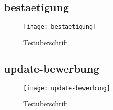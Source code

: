 \begin{landscape}
\subsection{bestaetigung}
\begin{figure}[H]
    \centering
    \caption{Testüberschrift}
    \begin{adjustbox}{width=\linewidth, center}
        \texttt{[image: bestaetigung]}
    \end{adjustbox}
\end{figure}

\subsection{update-bewerbung}
\begin{figure}[H]
    \centering
    \caption{Testüberschrift}
    \begin{adjustbox}{width=\linewidth, center}
        \texttt{[image: update-bewerbung]}
    \end{adjustbox}
\end{figure}

\end{landscape}
